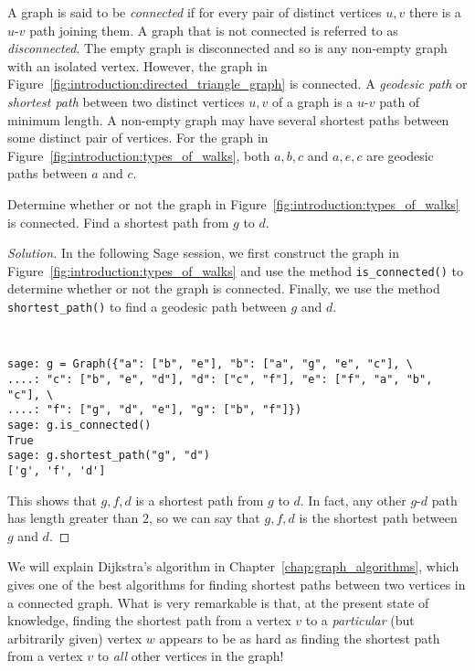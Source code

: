 A graph is said to be \emph{connected} if for every pair of distinct
vertices $u, v$ there is a $u$-$v$ path joining them. A graph that is
not connected is referred to as \emph{disconnected}. The empty graph
is disconnected and so is any non-empty graph with an isolated
vertex. However, the graph in
Figure~\ref{fig:introduction:directed_triangle_graph} is
connected. A \emph{geodesic path} or \emph{shortest path} between two
distinct vertices $u,v$ of a graph is a $u$-$v$ path of minimum
length. A non-empty graph may have several shortest paths between some
distinct pair of vertices. For the graph in
Figure~\ref{fig:introduction:types_of_walks}, both $a,b,c$ and $a,e,c$
are geodesic paths between $a$ and $c$.

\begin{exercise}
Determine whether or not the graph in
Figure~\ref{fig:introduction:types_of_walks} is connected. Find a
shortest path from $g$ to $d$.
\end{exercise}

\begin{proof}[Solution]
In the following Sage session, we first construct the graph in
Figure~\ref{fig:introduction:types_of_walks} and use the method
\verb!is_connected()! to determine whether or not the graph is
connected. Finally, we use the method \verb!shortest_path()! to find
a geodesic path between $g$ and $d$.
%
\begin{center}
\fontsize{10pt}{10pt}
\selectfont
\tt
\begin{lstlisting}
sage: g = Graph({"a": ["b", "e"], "b": ["a", "g", "e", "c"], \
....: "c": ["b", "e", "d"], "d": ["c", "f"], "e": ["f", "a", "b", "c"], \
....: "f": ["g", "d", "e"], "g": ["b", "f"]})
sage: g.is_connected()
True
sage: g.shortest_path("g", "d")
['g', 'f', 'd']
\end{lstlisting}
\end{center}
%
This shows that $g, f, d$ is a shortest path from $g$ to $d$. In fact,
any other $g$-$d$ path has length greater than $2$, so we can say that
$g, f, d$ is the shortest path between $g$ and $d$.
\end{proof}

We will explain Dijkstra's algorithm in
Chapter~\ref{chap:graph_algorithms}, which gives one of the best
algorithms for finding shortest paths between two vertices in a
connected graph. What is very remarkable is that, at the present state
of knowledge, finding the shortest path from a vertex $v$ to a
\emph{particular} (but arbitrarily given) vertex $w$ appears to be as
hard as finding the shortest path from a vertex $v$ to \emph{all}
other vertices in the graph!


